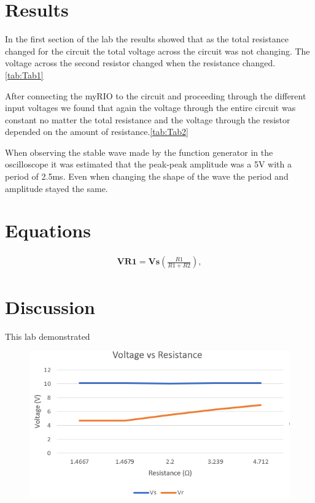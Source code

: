 \documentclass[10pt,twocolumn]{article}
\begin{document}
\section{Results}

 In the first section of the lab the results showed that as the total resistance changed for the circuit the total voltage across the circuit was not changing. The voltage across the second resistor changed when the resistance changed. \autoref{tab:Tab1}
 
 	After connecting the myRIO to the circuit and proceeding through the different input voltages we found that again the voltage through the entire circuit was constant no matter the total resistance and the voltage through the resistor depended on the amount of resistance.\autoref{tab:Tab2}
 	
 	When observing the stable wave made by the function generator in the oscilloscope it was estimated that the peak-peak amplitude was a 5V with a period of 2.5ms. Even when changing the shape of the wave the period and amplitude stayed the same.  
 	  
\section{Equations}


\begin{align}
	\bm{VR1} = \bm{Vs} 
    	\left(
        	\frac{R1}{R1+R2}
        \right), 
\end{align}
\section{Discussion}
This lab demonstrated 
\begin{figure}
	\centering
	\includegraphics[width=.9\linewidth]{figures/V vs R.PNG}
	\caption{}
	\label{fig:graph}
\end{figure}
\end{document}
